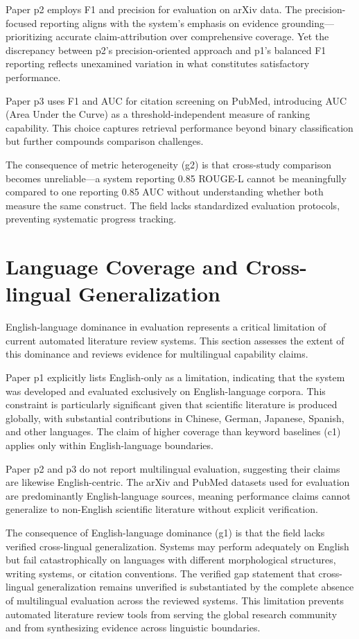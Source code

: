 \documentclass{article}
\begin{document}
Paper p2 employs F1 and precision for evaluation on arXiv data. The precision-focused reporting aligns with the system's emphasis on evidence grounding—prioritizing accurate claim-attribution over comprehensive coverage. Yet the discrepancy between p2's precision-oriented approach and p1's balanced F1 reporting reflects unexamined variation in what constitutes satisfactory performance.

Paper p3 uses F1 and AUC for citation screening on PubMed, introducing AUC (Area Under the Curve) as a threshold-independent measure of ranking capability. This choice captures retrieval performance beyond binary classification but further compounds comparison challenges.

The consequence of metric heterogeneity (g2) is that cross-study comparison becomes unreliable—a system reporting 0.85 ROUGE-L cannot be meaningfully compared to one reporting 0.85 AUC without understanding whether both measure the same construct. The field lacks standardized evaluation protocols, preventing systematic progress tracking.

\section{Language Coverage and Cross-lingual Generalization}
English-language dominance in evaluation represents a critical limitation of current automated literature review systems. This section assesses the extent of this dominance and reviews evidence for multilingual capability claims.

Paper p1 explicitly lists English-only as a limitation, indicating that the system was developed and evaluated exclusively on English-language corpora. This constraint is particularly significant given that scientific literature is produced globally, with substantial contributions in Chinese, German, Japanese, Spanish, and other languages. The claim of higher coverage than keyword baselines (c1) applies only within English-language boundaries.

Paper p2 and p3 do not report multilingual evaluation, suggesting their claims are likewise English-centric. The arXiv and PubMed datasets used for evaluation are predominantly English-language sources, meaning performance claims cannot generalize to non-English scientific literature without explicit verification.

The consequence of English-language dominance (g1) is that the field lacks verified cross-lingual generalization. Systems may perform adequately on English but fail catastrophically on languages with different morphological structures, writing systems, or citation conventions. The verified gap statement that cross-lingual generalization remains unverified is substantiated by the complete absence of multilingual evaluation across the reviewed systems. This limitation prevents automated literature review tools from serving the global research community and from synthesizing evidence across linguistic boundaries.
\end{document}
